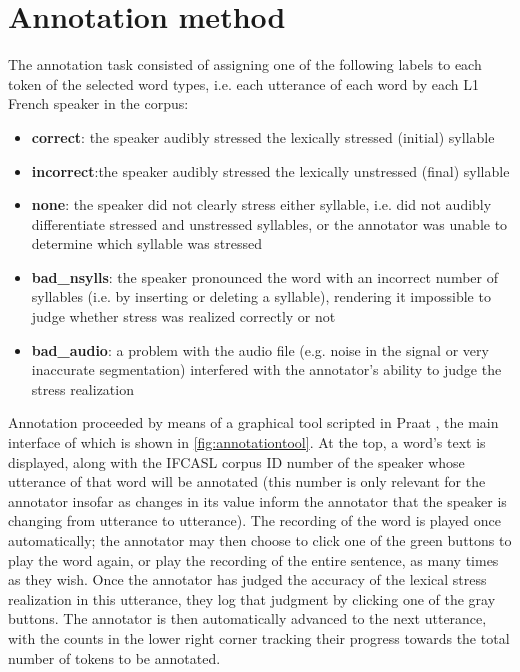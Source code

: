 	
	\section{Annotation method}
	\label{sec:lexstress:method}

	The annotation task consisted of assigning one of the following labels to 
	each token of the selected word types, i.e. each utterance of each word by each L1 French speaker in the corpus:
	
	\begin{itemize}
	\item{\textbf{correct}: the speaker audibly stressed the lexically stressed (initial) syllable}
	\item{\textbf{incorrect}:the speaker audibly stressed the lexically unstressed (final) syllable}
	\item{\textbf{none}: the speaker did not clearly stress either syllable, i.e. did not audibly differentiate stressed and unstressed syllables, or the annotator was unable to determine which syllable was stressed}
	\item{\textbf{bad\_nsylls}: the speaker pronounced the word with an incorrect number of syllables (i.e. by inserting or deleting a syllable), rendering it impossible to judge whether stress was realized correctly or not}
	\item{\textbf{bad\_audio}: a problem with the audio file (e.g. noise in the signal or very inaccurate segmentation) interfered with the annotator's ability to judge the stress realization}
	 \end{itemize}
	
	Annotation proceeded by means of a graphical tool scripted in Praat \parencite{Boersma2014}, the main interface of which is shown in \cref{fig:annotationtool}. At the top, a word's text is displayed, along with the IFCASL corpus ID number of the speaker whose utterance of that word will be annotated (this number is only relevant for the annotator insofar as changes in its value inform the annotator that the speaker is changing from utterance to utterance). The recording of the word
is played once automatically; the annotator may then choose to click one of the green buttons to play the word again, or play the recording of the entire sentence, as many times as they wish. Once the annotator has judged the accuracy of the lexical stress realization in this utterance, they log that judgment by clicking one of the gray buttons. The annotator is then automatically advanced to the next utterance, with the counts in the lower right corner tracking their progress towards the total number of tokens to be annotated. 

